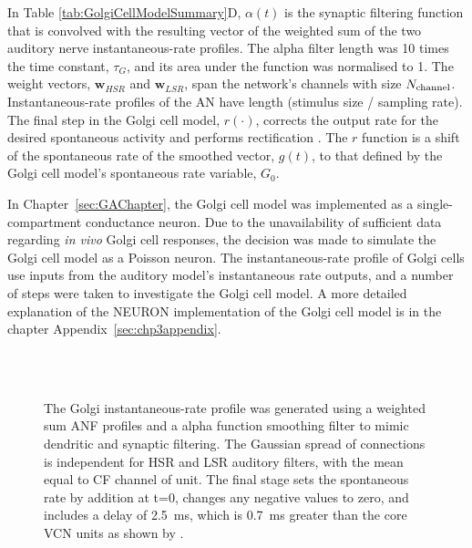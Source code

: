 In Table \ref{tab:GolgiCellModelSummary}D, $\alpha(t)$ is the synaptic filtering
function that is convolved with the resulting vector of the weighted sum of the
two auditory nerve instantaneous-rate profiles. The alpha filter length was 10
times the time constant, $\tau_{G}$, and its area under the function was
normalised to 1. The weight vectors, $\mathbf{w}_{HSR}$ and $\mathbf{w}_{LSR}$,
span the network's channels with size $N_{\rm channel}$. Instantaneous-rate
profiles of the AN have length (stimulus size / sampling rate).  The final step
in the Golgi cell model, $r(\cdot)$, corrects the output rate for the desired
spontaneous activity and performs rectification .  The $r$ function is a shift
of the spontaneous rate of the smoothed vector, $g(t)$, to that defined by the
Golgi cell model's spontaneous rate variable, $G_0$.


In Chapter~\ref{sec:GAChapter}, the Golgi cell model was implemented as a
single-compartment conductance neuron. Due to the unavailability of sufficient
data regarding \emph{in vivo} Golgi cell responses, the decision was made to
simulate the Golgi cell model as a Poisson neuron.  The instantaneous-rate
profile of Golgi cells use inputs from the auditory model's instantaneous rate
outputs, and a number of steps were taken to investigate the Golgi cell model. A
more detailed explanation of the NEURON implementation of the Golgi cell model
is in the chapter Appendix~\ref{sec:chp3appendix}.  %





\begin{figure}[h!]
  \centering
  \\
  \resizebox{0.9\textwidth}{!}{}\\
  \caption{The Golgi instantaneous-rate profile was generated using a weighted
    sum ANF profiles and a alpha function smoothing filter to mimic dendritic
    and synaptic filtering. The Gaussian spread of connections is independent
    for HSR and LSR auditory filters, with the mean equal to CF channel of
    unit. The final stage sets the spontaneous rate by addition at t=0, changes
    any negative values to zero, and includes a delay of 2.5~ms, which is 0.7~ms
    greater than the core VCN units as shown by \citet{GhoshalKim:1997}.}
  \label{fig:GolgiDiagram}
\end{figure}

